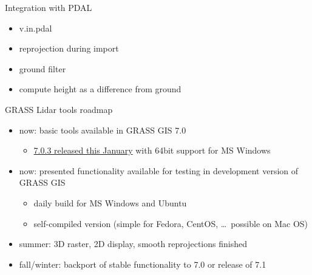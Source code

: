 \documentclass[xcolor={dvipsnames,usenames},beamer,aspectratio=169]{beamer}
\begin{document}

\begin{frame}{Integration with PDAL}

\begin{block}{}
 \begin{itemize}
  \item v.in.pdal
  \item reprojection during import
  \item ground filter
  \item compute height as a difference from ground
 \end{itemize}
\end{block}

\end{frame}

\begin{frame}{GRASS Lidar tools roadmap}

 \begin{itemize}
  \item now: basic tools available in GRASS GIS 7.0
    \begin{itemize}
      \item \href{https://grass.osgeo.org/news/54/15/GRASS-GIS-7-0-3-released/}{7.0.3 released this January}
	with 64bit support for MS Windows
    \end{itemize}
  \item now: presented functionality available for testing in development version of GRASS GIS
    \begin{itemize}
      \item daily build for MS Windows and Ubuntu
      \item self-compiled version (simple for Fedora, CentOS, \ldots\ possible on Mac OS)
    \end{itemize}
  \item summer: 3D raster, 2D display, smooth reprojections finished
  \item fall/winter: backport of stable functionality to 7.0 or release of 7.1
 \end{itemize}

\end{frame}
\end{document}
